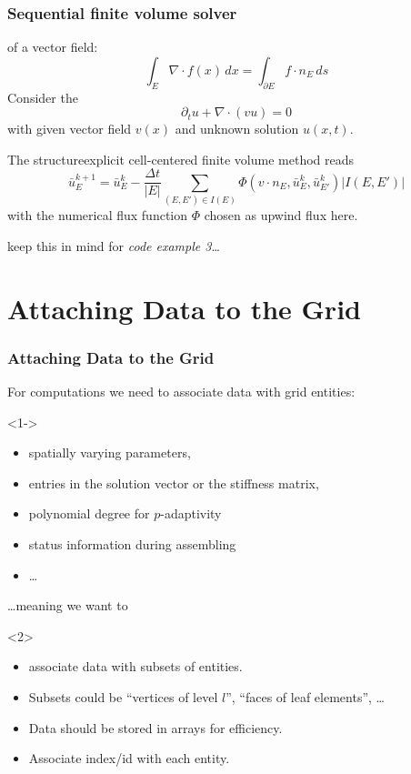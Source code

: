\documentclass[aspectratio=169,11pt]{beamer}
\theoremstyle{definition}
\newcommand{\blackframe}{
}
\newcommand{\presentationbreak}{%
  \blackframe
  \begin{frame}[noframenumbering,plain]
    \partpage
  \end{frame}
}
\begin{document}
\begin{frame}[fragile]
  \frametitle{Sequential finite volume solver}
 of a vector field:
\begin{equation*}
\int_{E} \nabla\cdot f(x) \,dx = \int_{\partial E} f\cdot n_E \,ds
\end{equation*}
\pause
\bigskip
Consider the 
$$ \partial_t u + \nabla\cdot(vu) = 0$$
with given vector field $v(x)$ and unknown solution $u(x,t)$.

The structure{explicit cell-centered finite volume method} reads
$$ \bar{u}_E^{k+1} = \bar{u}_E^{k} - \frac{\Delta t}{|E|} \sum_{(E,E')\in I(E)}
\Phi(v\cdot n_E,\bar{u}_E^{k},\bar{u}_{E'}^{k}) |I(E,E')|$$
with the numerical flux function $\Phi$ chosen as upwind flux here.

\bigskip
\begin{center}
  \pause
\rightarrownice keep this in mind for \emph{code example 3}\ldots
\end{center}
\end{frame}

\presentationbreak
\section{Attaching Data to the Grid}

\begin{frame} \frametitle{Attaching Data to the Grid}

  For computations we need to associate data with grid entities:

  \begin{uncoverenv}<1->
  \begin{itemize}
  \item spatially varying parameters,
  \item entries in the solution vector or the stiffness matrix,
  \item polynomial degree for $p$-adaptivity
  \item status information during assembling
  \item \ldots
  \end{itemize}
  \end{uncoverenv}

  \pause
  \ldots meaning we want to
  
  \begin{uncoverenv}<2>
  \begin{itemize}
  \item associate data with subsets of entities.
  \item Subsets could be ``vertices of level $l$'', ``faces of leaf
    elements'', \ldots
  \item Data should be stored in arrays for efficiency.
  \item Associate index/id with each entity.
  \end{itemize}
  \end{uncoverenv}

\end{frame}
\end{document}
